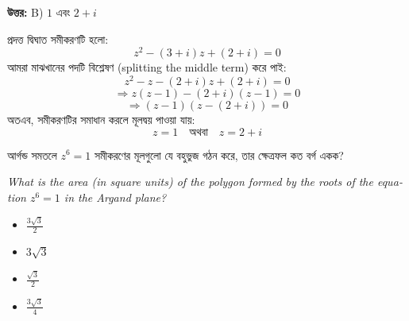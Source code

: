 \documentclass[12pt, a4paper]{article}
\begin{document}
\vspace{0.5em}
\begin{tcolorbox}[answerbox]
    \textbf{\color{success} উত্তর:} B) $1$ এবং $2+i$
\end{tcolorbox}
\vspace{1em}

\begin{tcolorbox}[solutionbox={সমাধান (Solution)}]
    \noindent
    প্রদত্ত দ্বিঘাত সমীকরণটি হলো:
    \[ z^2 - (3+i)z + (2+i) = 0 \]
    আমরা মাঝখানের পদটি বিশ্লেষণ (splitting the middle term) করে পাই:
    \[ z^2 - z - (2+i)z + (2+i) = 0 \]
    \[ \Rightarrow z(z - 1) - (2+i)(z - 1) = 0 \]
    \[ \Rightarrow (z - 1)(z - (2+i)) = 0 \]
    অতএব, সমীকরণটির সমাধান করলে মূলদ্বয় পাওয়া যায়:
    \[ z = 1 \quad \text{অথবা} \quad z = 2+i \]
\end{tcolorbox}

\vspace{1.5em}

\begin{tcolorbox}[questionbox={প্রশ্ন (Question) 25}]
    \noindent
    আর্গন্ড সমতলে $z^6 = 1$ সমীকরণের মূলগুলো যে বহুভুজ গঠন করে, তার ক্ষেত্রফল কত বর্গ একক?
    
    \vspace{0.8em}
    \begin{english}
    \noindent\textit{\color{darkgray}
    What is the area (in square units) of the polygon formed by the roots of the equation $z^6 = 1$ in the Argand plane?
    }
    \end{english}
\end{tcolorbox}

\begin{itemize}[label={}, leftmargin=1cm, itemsep=0.5em]
    \item[\textbf{A)}] $\frac{3\sqrt{3}}{2}$
    \item[\textbf{B)}] $3\sqrt{3}$
    \item[\textbf{C)}] $\frac{\sqrt{3}}{2}$
    \item[\textbf{D)}] $\frac{3\sqrt{3}}{4}$
\end{itemize}
\end{document}
